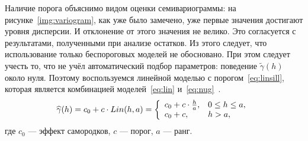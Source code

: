 Наличие порога объяснимо видом оценки семивариограммы: на рисунке~\ref{img:variogram}, как уже было замечено, уже первые значения достигают уровня дисперсии. И отклонение от этого значения не велико. Это согласуется с результатами, полученными при анализе остатков. Из этого следует, что использование только беспороговых моделей не обосновано. При этом следует учесть то, что не учёл автоматический подбор параметров: поведение $ \tilde{\gamma}(h) $ около нуля. Поэтому воспользуемся линейной моделью с порогом~\eqref{eq:linsill}, которая является комбинацией моделей~\eqref{eq:lin} и~\eqref{eq:nug}~\cite{pebesma2001gstat}.
\begin{equation}
\label{eq:linsill}
	\widehat{\gamma}(h) = c_0 + c \cdot Lin(h, a) = \left\{
 \begin{array}{l l}
   c_0 + c \cdot \frac{h}{a}, & 0 \leq h \leq a, \\
   c_0 + c, & h > a,
 \end{array} \right.
\end{equation}
где $ c_0 $ --- эффект самородков, $ c $ --- порог, $ a $ --- ранг.

